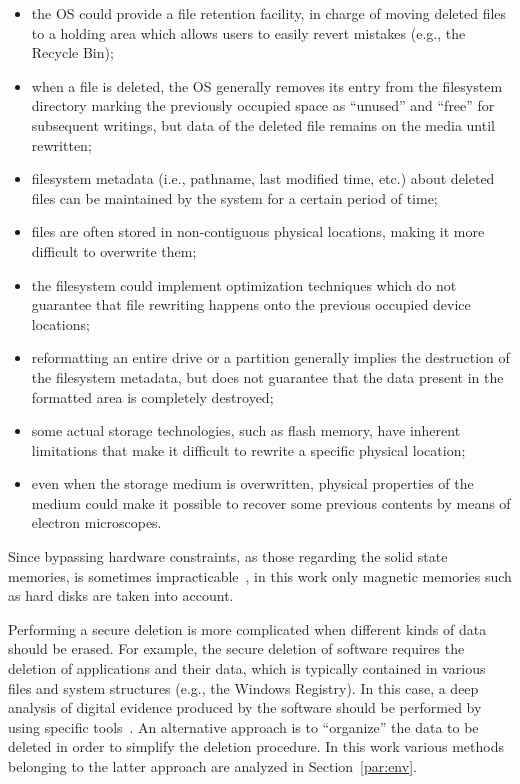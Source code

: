 \documentclass[10pt, conference, compsocconf]{IEEEtran}
\begin{document}
\begin{itemize}
 \item the OS could provide a file retention facility, in charge of moving deleted files to a holding area which allows users to easily revert mistakes (e.g., the Recycle Bin);
 \item when a file is deleted, the OS generally removes its entry from the filesystem directory marking the previously occupied space as ``unused'' and ``free'' for subsequent writings, but data of the deleted file remains on the media until rewritten;
 \item filesystem metadata (i.e., pathname, last modified time, etc.) about deleted files can be maintained by the system for a certain period of time;
 \item files are often stored in non-contiguous physical locations, making it more difficult to overwrite them;
 \item the filesystem could implement optimization techniques which do not guarantee that file rewriting happens onto the previous occupied device locations;
 \item reformatting an entire drive or a partition generally implies the destruction of the filesystem metadata, but does not guarantee that the data present in the formatted area is completely destroyed;
 \item some actual storage technologies, such as flash memory, have inherent limitations that make it difficult to rewrite a specific physical location;
 \item even when the storage medium is overwritten, physical properties of the medium could make it possible to recover some previous contents by means of electron microscopes.
\end{itemize}

Since bypassing hardware constraints, as those regarding the solid state memories, is sometimes impracticable~\cite{solid}, in this work only magnetic memories such as hard disks are taken into account.

Performing a secure deletion is more complicated when different kinds of data should be erased. For example, the secure deletion of software requires the deletion of applications and their data, which is typically contained in various files and system structures (e.g., the Windows Registry). In this case, a deep analysis of digital evidence produced by the software should be performed by using specific tools~\cite{autoalibi}. An alternative approach is to ``organize'' the data to be deleted in order to simplify the deletion procedure. In this work various methods belonging to the latter approach are analyzed in Section~\ref{par:env}.
\end{document}

